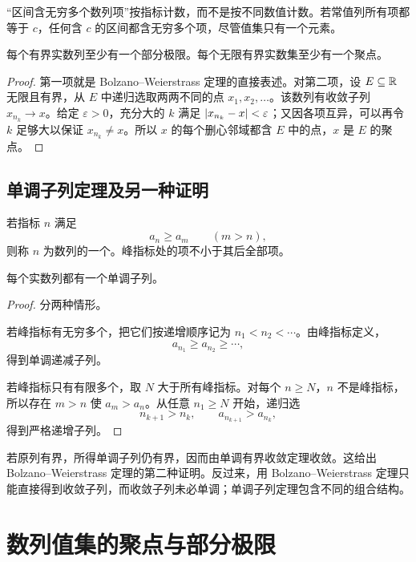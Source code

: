 “区间含无穷多个数列项”按指标计数，而不是按不同数值计数。若常值列所有项都等于 \(c\)，任何含 \(c\) 的区间都含无穷多个项，尽管值集只有一个元素。

\begin{corollary}
每个有界实数列至少有一个部分极限。每个无限有界实数集至少有一个聚点。
\end{corollary}

\begin{proof}
第一项就是 Bolzano--Weierstrass 定理的直接表述。对第二项，设
\(E\subseteq\mathbb{R}\) 无限且有界，从 \(E\) 中递归选取两两不同的点
\(x_1,x_2,\ldots\)。该数列有收敛子列 \(x_{n_k}\to x\)。给定
\(\varepsilon>0\)，充分大的 \(k\) 满足
\(\left|x_{n_k}-x\right|<\varepsilon\)；又因各项互异，可以再令 \(k\) 足够大以保证 \(x_{n_k}\ne x\)。所以 \(x\) 的每个删心邻域都含 \(E\) 中的点，\(x\) 是 \(E\) 的聚点。
\end{proof}

\subsection{单调子列定理及另一种证明}


\begin{definition}
若指标 \(n\) 满足
\[
 a_n\ge a_m\qquad(m>n),
\]
则称 \(n\) 为数列的一个。峰指标处的项不小于其后全部项。
\end{definition}

\begin{theorem}[单调子列定理]
每个实数列都有一个单调子列。
\end{theorem}

\begin{proof}
分两种情形。

若峰指标有无穷多个，把它们按递增顺序记为
\(n_1<n_2<\cdots\)。由峰指标定义，
\[
 a_{n_1}\ge a_{n_2}\ge\cdots,
\]
得到单调递减子列。

若峰指标只有有限多个，取 \(N\) 大于所有峰指标。对每个 \(n\ge N\)，\(n\) 不是峰指标，所以存在 \(m>n\) 使 \(a_m>a_n\)。从任意 \(n_1\ge N\) 开始，递归选
\[
 n_{k+1}>n_k,\qquad a_{n_{k+1}}>a_{n_k},
\]
得到严格递增子列。
\end{proof}

若原列有界，所得单调子列仍有界，因而由单调有界收敛定理收敛。这给出 Bolzano--Weierstrass 定理的第二种证明。反过来，用 Bolzano--Weierstrass 定理只能直接得到收敛子列，而收敛子列未必单调；单调子列定理包含不同的组合结构。

\section{数列值集的聚点与部分极限}

